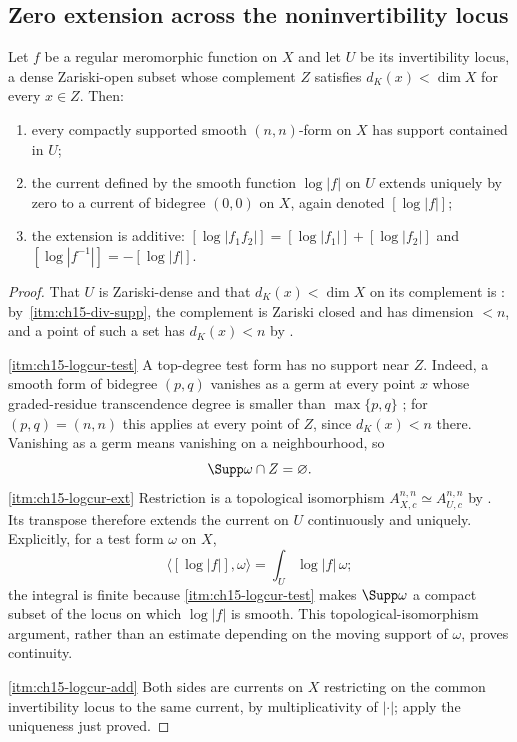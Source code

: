 \subsection{Zero extension across the noninvertibility locus}

\begin{proposition}
\label{prop:ch15-log-current}
Let $f$ be a regular meromorphic function on $X$ and let $U$ be its
invertibility locus, a dense Zariski-open subset whose complement $Z$
satisfies $d_K(x)<\dim X$ for every $x\in Z$.  Then:
\begin{enumerate}
\item\label{itm:ch15-logcur-test} every compactly supported smooth
  $(n,n)$-form on $X$ has support contained in $U$;
\item\label{itm:ch15-logcur-ext} the current defined by the smooth function
  $\log|f|$ on $U$ extends uniquely by zero to a current of bidegree $(0,0)$
  on $X$, again denoted $[\log|f|]$;
\item\label{itm:ch15-logcur-add} the extension is additive:
  $[\log|f_1f_2|]=[\log|f_1|]+[\log|f_2|]$ and
  $[\log|f^{-1}|]=-[\log|f|]$.
\end{enumerate}
\end{proposition}

\begin{proof}
That $U$ is Zariski-dense and that $d_K(x)<\dim X$ on its complement is
\cite[\S16.7.2]{CLD25}: by
\,\cref{itm:ch15-div-supp}, the complement is
Zariski closed and has dimension $<n$, and a point of such a set has
$d_K(x)<n$ by
.

\cref{itm:ch15-logcur-test}
A top-degree test form has no support near $Z$.
Indeed, a smooth form of bidegree $(p,q)$ vanishes as a germ at every point
$x$ whose graded-residue transcendence degree is smaller than $\max\{p,q\}$
\cite[Proposition~15.2.1]{CLD25}; for $(p,q)=(n,n)$ this applies at every
point of $Z$, since $d_K(x)<n$ there.  Vanishing as a germ means vanishing on
a neighbourhood, so
\[
 \Supp\omega\cap Z=\varnothing .
\]
\cref{itm:ch15-logcur-ext}
Restriction is a topological isomorphism
$A_{X,c}^{n,n}\simeq A_{U,c}^{n,n}$ by
\cite[Lemma~7.1.13]{CLD25}.  Its transpose therefore extends the current on
$U$ continuously and uniquely.  Explicitly, for a test form $\omega$ on
$X$,
\[
 \langle[\log|f|],\omega\rangle
   =\int_U\log|f|\,\omega;
\]
the integral is finite because \cref{itm:ch15-logcur-test} makes
$\Supp\omega$ a compact subset of the locus on which $\log|f|$ is smooth.
This topological-isomorphism argument, rather than an estimate depending on
the moving support of $\omega$, proves continuity.

\cref{itm:ch15-logcur-add}
Both sides are currents on $X$ restricting on the common invertibility locus
to the same current, by multiplicativity of $|\cdot|$; apply the uniqueness
just proved.
\end{proof}

